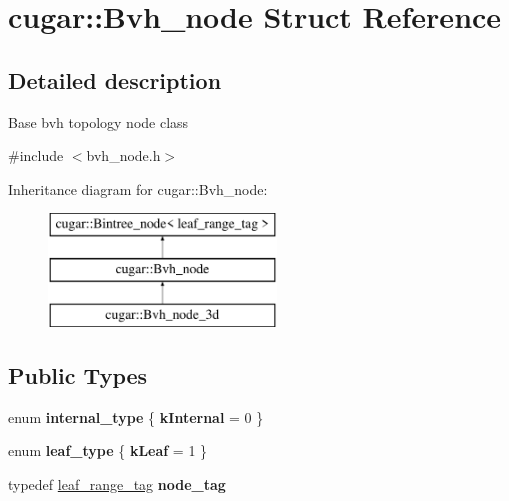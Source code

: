 \hypertarget{structcugar_1_1_bvh__node}{}\section{cugar\+:\+:Bvh\+\_\+node Struct Reference}
\label{structcugar_1_1_bvh__node}


\subsection{Detailed description}
Base bvh topology node class 

{\ttfamily \#include $<$bvh\+\_\+node.\+h$>$}

Inheritance diagram for cugar\+:\+:Bvh\+\_\+node\+:\begin{figure}[H]
\begin{center}
\leavevmode
\includegraphics[height=3.000000cm]{structcugar_1_1_bvh__node}
\end{center}
\end{figure}
\subsection*{Public Types}
\begin{DoxyCompactItemize}
\item 
\mbox{\label{structcugar_1_1_bvh__node_a758bf8378fd0be765c34fcb8e33ce5cd}} 
enum {\bfseries internal\+\_\+type} \{ {\bfseries k\+Internal} = 0
 \}
\item 
\mbox{\label{structcugar_1_1_bvh__node_ad519c4c28c5cb4d610a49845fc40acd2}} 
enum {\bfseries leaf\+\_\+type} \{ {\bfseries k\+Leaf} = 1
 \}
\item 
\mbox{\label{structcugar_1_1_bvh__node_a7d5b7c3b6baccd383cf0e2de725fa625}} 
typedef \hyperlink{structcugar_1_1leaf__range__tag}{leaf\+\_\+range\+\_\+tag} {\bfseries node\+\_\+tag}
\end{DoxyCompactItemize}
